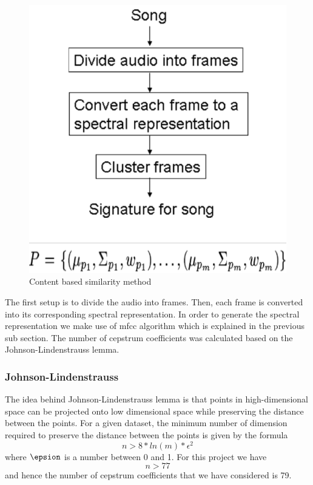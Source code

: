 \documentclass[12pt]{article}
\begin{document}
\begin{figure}[h]
\center
\includegraphics{fig1.png}
\caption{Content based similarity method}
\end{figure}

The first setup is to divide the audio into frames. Then, each frame is converted into its corresponding spectral representation. In order to generate the spectral representation we make use of mfcc algorithm which is explained in the previous sub section. The number of cepstrum coefficients was calculated based on the Johnson-Lindenstrauss lemma.

\subsubsection{Johnson-Lindenstrauss}
The idea behind Johnson-Lindenstrauss lemma
is that points in high-dimensional space can be projected onto low dimensional space while preserving the distance between the points. For a given dataset, the minimum number of dimension required to preserve the distance between the points is given by the formula $$ n > 8 * ln(m) * \epsilon ^ 2 $$ where $\epsion$ is a number between 0 and 1. For this project we have $$ n > 77$$ and hence the number of cepstrum coefficients that we have considered is 79.
\end{document}
